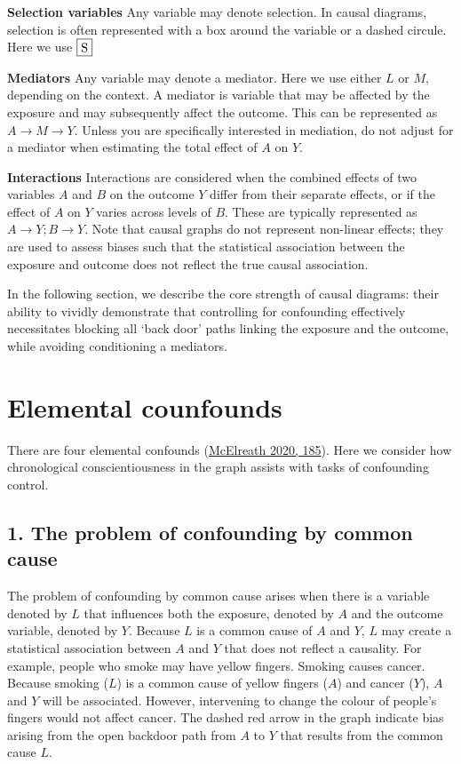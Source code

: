 \documentclass[
  singlecolumn]{report}
\begin{document}
\textbf{Selection variables} Any variable may denote selection. In
causal diagrams, selection is often represented with a box around the
variable or a dashed circule. Here we use \(\framebox{S}\)

\textbf{Mediators} Any variable may denote a mediator. Here we use
either \(L\) or \(M\), depending on the context. A mediator is variable
that may be affected by the exposure and may subsequently affect the
outcome. This can be represented as \(A \to M \to Y\). Unless you are
specifically interested in mediation, do not adjust for a mediator when
estimating the total effect of \(A\) on \(Y\).

\textbf{Interactions} Interactions are considered when the combined
effects of two variables \(A\) and \(B\) on the outcome \(Y\) differ
from their separate effects, or if the effect of \(A\) on \(Y\) varies
across levels of \(B\). These are typically represented as
\(A \to Y; B \to Y\). Note that causal graphs do not represent
non-linear effects; they are used to assess biases such that the
statistical association between the exposure and outcome does not
reflect the true causal association.

In the following section, we describe the core strength of causal
diagrams: their ability to vividly demonstrate that controlling for
confounding effectively necessitates blocking all `back door' paths
linking the exposure and the outcome, while avoiding conditioning a
mediators.

\hypertarget{elemental-counfounds}{%
\section{Elemental counfounds}\label{elemental-counfounds}}

There are four elemental confounds
(\protect\hyperlink{ref-mcelreath2020}{McElreath 2020, 185}). Here we
consider how chronological conscientiousness in the graph assists with
tasks of confounding control.

\hypertarget{the-problem-of-confounding-by-common-cause}{%
\subsection{1. The problem of confounding by common
cause}\label{the-problem-of-confounding-by-common-cause}}

The problem of confounding by common cause arises when there is a
variable denoted by \(L\) that influences both the exposure, denoted by
\(A\) and the outcome variable, denoted by \(Y.\) Because \(L\) is a
common cause of \(A\) and \(Y\), \(L\) may create a statistical
association between \(A\) and \(Y\) that does not reflect a causality.
For example, people who smoke may have yellow fingers. Smoking causes
cancer. Because smoking (\(L\)) is a common cause of yellow fingers
(\(A\)) and cancer (\(Y\)), \(A\) and \(Y\) will be associated. However,
intervening to change the colour of people's fingers would not affect
cancer. The dashed red arrow in the graph indicate bias arising from the
open backdoor path from \(A\) to \(Y\) that results from the common
cause \(L\).
\end{document}
